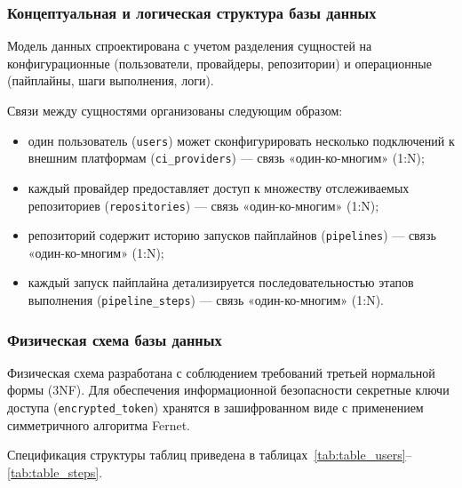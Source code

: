 \subsubsection{Концептуальная и логическая структура базы данных}

Модель данных спроектирована с учетом разделения сущностей на конфигурационные (пользователи, провайдеры, репозитории) и операционные (пайплайны, шаги выполнения, логи).

Связи между сущностями организованы следующим образом:
\begin{itemize}
    \item один пользователь (\texttt{users}) может сконфигурировать несколько подключений к внешним платформам (\texttt{ci\_providers}) --- связь «один-ко-многим» (1:N);
    \item каждый провайдер предоставляет доступ к множеству отслеживаемых репозиториев (\texttt{repositories}) --- связь «один-ко-многим» (1:N);
    \item репозиторий содержит историю запусков пайплайнов (\texttt{pipelines}) --- связь «один-ко-многим» (1:N);
    \item каждый запуск пайплайна детализируется последовательностью этапов выполнения (\texttt{pipeline\_steps}) --- связь «один-ко-многим» (1:N).
\end{itemize}

\subsubsection{Физическая схема базы данных}

Физическая схема разработана с соблюдением требований третьей нормальной формы (3NF). Для обеспечения информационной безопасности секретные ключи доступа (\texttt{encrypted\_token}) хранятся в зашифрованном виде с применением симметричного алгоритма Fernet.

Спецификация структуры таблиц приведена в таблицах~\ref{tab:table_users}--\ref{tab:table_steps}.

